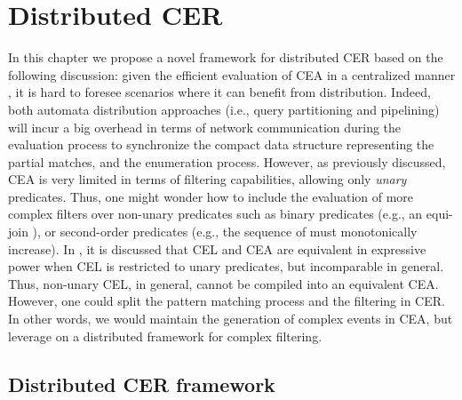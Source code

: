 \chapter{Distributed CER}\label{chapter:distributed-cer}

In this chapter we propose a novel framework for distributed CER based on the following discussion: given the efficient evaluation of CEA in a centralized manner \cite{formal-framework-cer, core}, it is hard to foresee scenarios where it can benefit from distribution. Indeed, both automata distribution approaches (i.e., query partitioning and pipelining) will incur a big overhead in terms of network communication during the evaluation process to synchronize the compact data structure representing the partial matches, and the enumeration process. However, as previously discussed, CEA is very limited in terms of filtering capabilities, allowing only \emph{unary} predicates. Thus, one might wonder how to include the evaluation of more complex filters over non-unary predicates such as binary predicates (e.g., an equi-join ), or second-order predicates (e.g., the sequence of  must monotonically increase). In \cite{on-the-expressiveness}, it is discussed that CEL and CEA are equivalent in expressive power when CEL is restricted to unary predicates, but incomparable in general. Thus, non-unary CEL, in general, cannot be compiled into an equivalent CEA. However, one could split the pattern matching process and the filtering in CER. In other words, we would maintain the generation of complex events in CEA, but leverage on a distributed framework for complex filtering.

\section{Distributed CER framework}\label{sec:framework}

